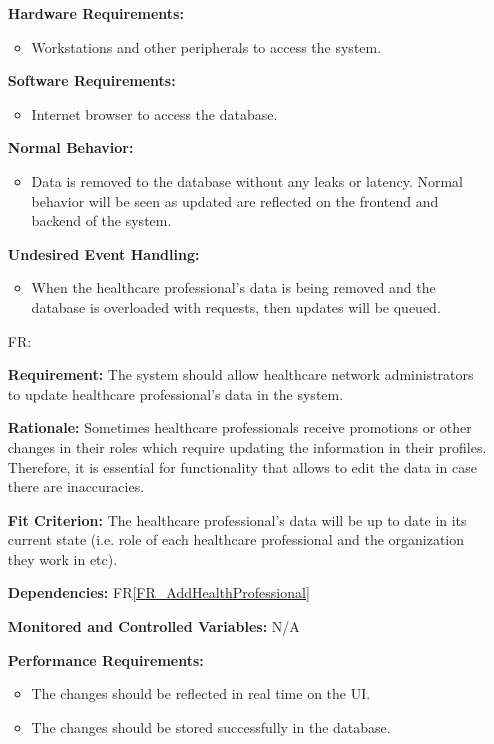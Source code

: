 \documentclass[12pt]{article}
\newcounter{reqnum} %
\begin{document}
\begin{itemize}
\textbf{Hardware Requirements:}
\begin{itemize}
  \item Workstations and other peripherals to access the system.
\end{itemize} 

\textbf{Software Requirements:}
\begin{itemize}
  \item Internet browser to access the database.
\end{itemize} 

\textbf{Normal Behavior:}
\begin{itemize}
  \item Data is removed to the database without any leaks or latency. Normal behavior will be seen as updated are reflected on the frontend and backend of the system.
\end{itemize} 

\textbf{Undesired Event Handling:}
\begin{itemize}
  \item When the healthcare professional's data is being removed and the database is overloaded with requests, then updates will be queued.
\end{itemize} 

\item[FR\refstepcounter{reqnum}\thereqnum \label{FR_UpdateHealthProfessionals}:]

\textbf{Requirement:} The system should allow healthcare network administrators to update healthcare professional's data in the system.

\textbf{Rationale:} Sometimes healthcare professionals receive promotions or other changes in their roles which require updating the information in their profiles. Therefore, it is essential for functionality that allows to edit the data in case there are inaccuracies.  

\textbf{Fit Criterion:} The healthcare professional's data will be up to date in its current state (i.e. role of each healthcare professional and the organization they work in etc). 

\textbf{Dependencies:} FR\ref{FR_AddHealthProfessional}

\textbf{Monitored and Controlled Variables:} N/A

\textbf{Performance Requirements:} 
\begin{itemize}
  \item The changes should be reflected in real time on the UI.
  \item The changes should be stored successfully in the database.
\end{itemize} 


\end{itemize}
\end{document}
